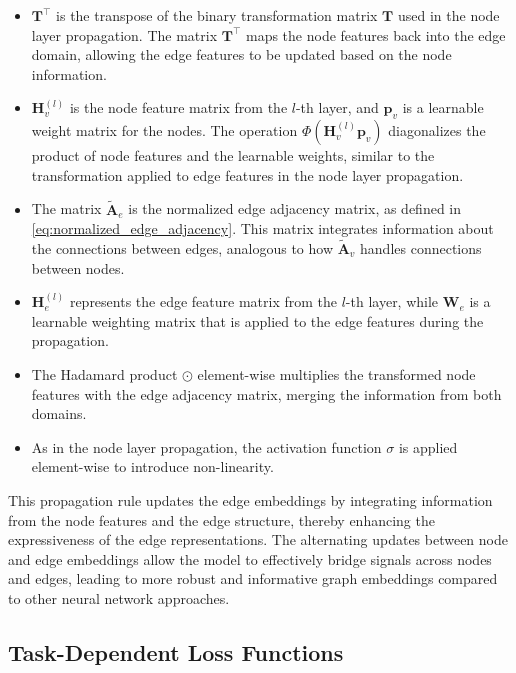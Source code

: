 \begin{itemize}
    \item \textbf{\( \mathbf{T}^\top \)} is the transpose of the binary transformation matrix \( \mathbf{T} \) used in the node layer propagation. The matrix \( \mathbf{T}^\top \) maps the node features back into the edge domain, allowing the edge features to be updated based on the node information.
    \item \( \mathbf{H}^{(l)}_v \) is the node feature matrix from the \( l \)-th layer, and \( \mathbf{p}_v \) is a learnable weight matrix for the nodes. The operation \( \Phi(\mathbf{H}^{(l)}_v \mathbf{p}_v) \) diagonalizes the product of node features and the learnable weights, similar to the transformation applied to edge features in the node layer propagation.
    \item The matrix \( \tilde{\mathbf{A}}_e \) is the normalized edge adjacency matrix, as defined in \cref{eq:normalized_edge_adjacency}. This matrix integrates information about the connections between edges, analogous to how \( \tilde{\mathbf{A}}_v \) handles connections between nodes.
    \item \( \mathbf{H}^{(l)}_e \) represents the edge feature matrix from the \( l \)-th layer, while \( \mathbf{W}_e \) is a learnable weighting matrix that is applied to the edge features during the propagation.
    \item The Hadamard product \( \odot \) element-wise multiplies the transformed node features with the edge adjacency matrix, merging the information from both domains.
    \item As in the node layer propagation, the activation function \( \sigma \) is applied element-wise to introduce non-linearity.
\end{itemize}


This propagation rule updates the edge embeddings by integrating information from the node features and the edge structure, thereby enhancing the expressiveness of the edge representations. The alternating updates between node and edge embeddings allow the model to effectively bridge signals across nodes and edges, leading to more robust and informative graph embeddings compared to other neural network approaches.




\subsection{Task-Dependent Loss Functions}

